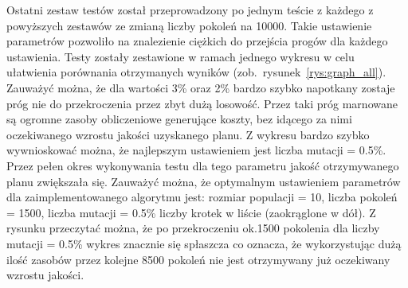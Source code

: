 	Ostatni zestaw testów został przeprowadzony po jednym teście z każdego z powyższych zestawów ze zmianą liczby pokoleń na 10000. Takie ustawienie parametrów pozwoliło na znalezienie ciężkich do przejścia progów dla każdego ustawienia. Testy zostały zestawione w ramach jednego wykresu w celu ułatwienia porównania otrzymanych wyników (zob.~rysunek~\ref{rys:graph_all}). Zauważyć można, że dla wartości 3\% oraz 2\% bardzo szybko napotkany zostaje próg nie do przekroczenia przez zbyt dużą losowość. Przez taki próg marnowane są ogromne zasoby obliczeniowe generujące koszty, bez idącego za nimi oczekiwanego wzrostu jakości uzyskanego planu. Z wykresu bardzo szybko wywnioskować można, że najlepszym ustawieniem jest liczba mutacji = 0.5\%. Przez pełen okres wykonywania testu dla tego parametru jakość otrzymywanego planu zwiększała się. Zauważyć można, że optymalnym ustawieniem parametrów dla zaimplementowanego algorytmu jest: rozmiar populacji = 10, liczba pokoleń = 1500, liczba mutacji = 0.5\% liczby krotek w liście (zaokrąglone w dół). Z rysunku przeczytać można, że po przekroczeniu ok.1500 pokolenia dla liczby mutacji = 0.5\% wykres znacznie się spłaszcza co oznacza, że wykorzystując dużą ilość zasobów przez kolejne 8500 pokoleń nie jest otrzymywany już oczekiwany wzrostu jakości.

